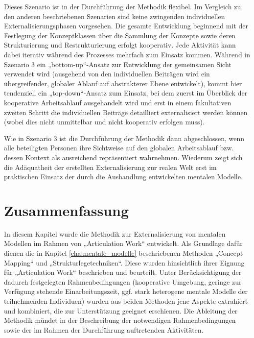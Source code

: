 Dieses Szenario ist in der Durchführung der Methodik flexibel. Im Vergleich zu den anderen beschriebenen Szenarien sind keine zwingenden individuellen Externalisierungsphasen vorgesehen. Die gesamte Entwicklung beginnend mit der Festlegung der Konzeptklassen über die Sammlung der Konzepte sowie deren Strukturierung und Restrukturierung erfolgt kooperativ. Jede Aktivität kann dabei iterativ während des Prozesses mehrfach zum Einsatz kommen. Während in Szenario 3 ein „bottom-up“-Ansatz zur Entwicklung der gemeinsamen Sicht verwendet wird (ausgehend von den individuellen Beiträgen wird ein übergreifender, globaler Ablauf auf abstrakterer Ebene entwickelt), kommt hier tendenziell ein „top-down“-Ansatz zum Einsatz, bei dem zuerst im Überblick der kooperative Arbeitsablauf ausgehandelt wird und erst in einem fakultativen zweiten Schritt die individuellen Beiträge detailliert externalisiert werden können (wobei dies nicht unmittelbar und nicht kooperativ erfolgen muss).

Wie in Szenario 3 ist die Durchführung der Methodik dann abgeschlossen, wenn alle beteiligten Personen ihre Sichtweise auf den globalen Arbeitsablauf bzw. dessen Kontext als ausreichend repräsentiert wahrnehmen. Wiederum zeigt sich die Adäquatheit der erstellten Externalisierung zur realen Welt erst im praktischen Einsatz der durch die Aushandlung entwickelten mentalen Modelle. 


\section{Zusammenfassung} %
\label{sec:methodik_zusammenfassung}

In diesem Kapitel wurde die Methodik zur Externalisierung von mentalen Modellen im Rahmen von „Articulation Work“ entwickelt. Als Grundlage dafür dienen die in Kapitel \ref{cha:mentale_modelle} beschriebenen Methoden „Concept Mapping“ und „Strukturlegetechniken“. Diese wurden hinsichtlich ihrer Eignung für „Articulation Work“ beschrieben und beurteilt. Unter Berücksichtigung der dadurch festgelegten Rahmenbedingungen (kooperative Umgebung, geringe zur Verfügung stehende Einarbeitungszeit, ggf. stark heterogene mentale Modelle der teilnehmenden Individuen) wurden aus beiden Methoden jene Aspekte extrahiert und kombiniert, die zur Unterstützung geeignet erschienen. Die Ableitung der Methodik mündet in der Beschreibung der notwendigen Rahmenbedingungen sowie der im Rahmen der Durchführung auftretenden Aktivitäten. 

